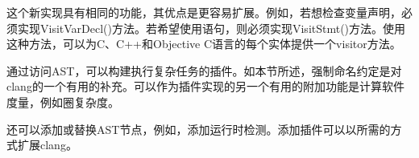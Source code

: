 这个新实现具有相同的功能，其优点是更容易扩展。例如，若想检查变量声明，必须实现VisitVarDecl()方法。若希望使用语句，则必须实现VisitStmt()方法。使用这种方法，可以为C、C++和Objective C语言的每个实体提供一个visitor方法。

通过访问AST，可以构建执行复杂任务的插件。如本节所述，强制命名约定是对clang的一个有用的补充。可以作为插件实现的另一个有用的附加功能是计算软件度量，例如圈复杂度。

还可以添加或替换AST节点，例如，添加运行时检测。添加插件可以以所需的方式扩展clang。






























